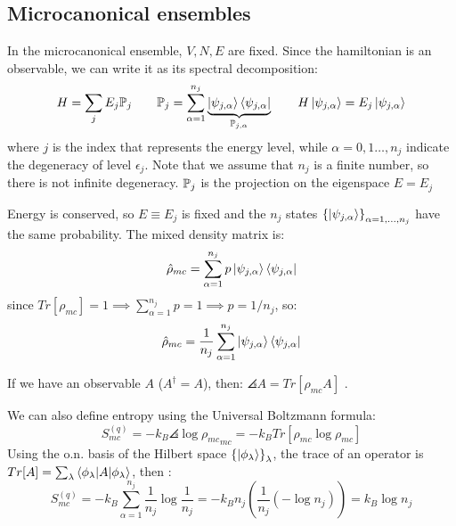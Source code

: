 \subsection{Microcanonical ensembles}
In the microcanonical ensemble, $V,N,E$ are fixed. Since the hamiltonian is an observable, we can write it as its spectral decomposition:
$$H = \sum_j E_j \mathbb{P}_j \qquad \mathbb{P}_j = \sum_{\alpha=1}^{n_j} \underbrace{\left|\psi_{j,\alpha}\right\rangle\left\langle\psi_{j,\alpha}\right|}_{\mathbb{P}_{j,\alpha}} \qquad H \left|\psi_{j,\alpha}\right\rangle = E_j\left|\psi_{j,\alpha}\right\rangle$$
where $j$ is the index that represents the energy level, while $\alpha = 0,1 \dots, n_j$  indicate the degeneracy of level $\epsilon_j$. Note that we assume that $n_j$ is a finite number, so there is not infinite degeneracy. $\mathbb{P}_j$ is the projection on the eigenspace $E=E_j$

Energy is conserved, so $E\equiv E_j$ is fixed and the $n_j$ states $\left\{\left|\psi_{j,\alpha}\right\rangle\right\}_{\alpha=1,\dots,n_j}$ have the same probability. The mixed density matrix is:
$$ \hat \rho_{mc} = \sum_{\alpha=1}^{n_j} p\left|\psi_{j,\alpha}\right\rangle \left\langle\psi_{j,\alpha}\right|$$
since $Tr\left[\rho_{mc}\right] = 1 \implies \sum_{\alpha=1}^{n_j} p = 1 \implies p= 1/n_j$, so:
$$ \hat \rho_{mc} = \frac1{n_j}\sum_{\alpha=1}^{n_j} \left|\psi_{j,\alpha}\right\rangle \left\langle\psi_{j,\alpha}\right|$$

If we have an observable $A$ ($A^\dag = A$), then: $\angles A = Tr\left[\rho_{mc}A\right]$ .

We can also define entropy using the Universal Boltzmann formula:
$$S_{mc}^{(q)} = -k_B \angles{\log \rho_{mc}}_{mc} = -k_BTr\left[\rho_{mc}\log\rho_{mc}\right]$$
Using the o.n. basis of the Hilbert space $\left\{\left|\phi_\lambda\right\rangle\right\}_\lambda$, the trace of an operator is $Tr[A] = \sum_\lambda \left\langle \phi_\lambda \middle| A \middle| \phi_\lambda \right\rangle$, then :
$$ S_{mc}^{(q)} = -k_B \sum_{\alpha=1}^{n_j} \frac 1{n_j} \log \frac1{n_j} = -k_B n_j \left(\frac 1{n_j} (-\log n_j)\right) = k_B \log n_j$$

